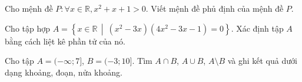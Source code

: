 

\begin{bt}%
	Cho mệnh đề $P:\forall x\in\mathbb{R},x^2+x+1>0$. Viết mệnh đề phủ định của mệnh đề $P$.
\end{bt}
\begin{bt}%
	Cho tập hợp $A=\left\{x\in\mathbb{R}\,\middle|\ (x^2-3x)(4x^2-3x-1)=0\right\}$. Xác định tập $A$ bằng cách liệt kê phần tử của nó.
\end{bt}
\begin{bt}%
	Cho tập $A=(-\infty;7]$, $B=(-3;10]$. Tìm $A\cap B$, $A\cup B$, $A\setminus B$ và ghi kết quả dưới dạng khoảng, đoạn, nửa khoảng.	
	\loigiai{
		$\bullet\, A\cap B=(-3;7]$.\\
		$\bullet\, A\cup B=(-\infty;10]$.\\
		$\bullet\, A\setminus B=(-\infty;-3]$.
			
	}
\end{bt}
